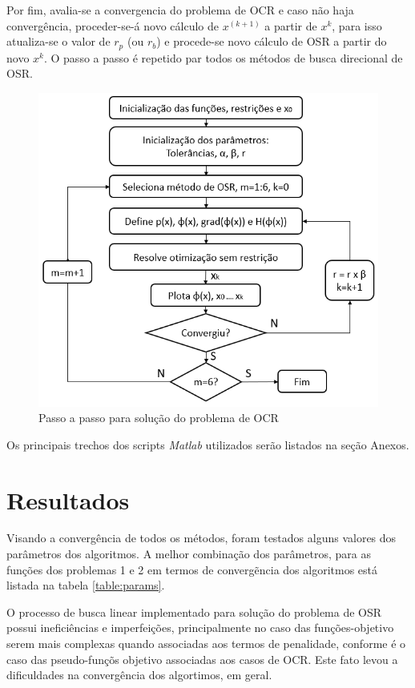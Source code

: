\documentclass[10pt, a4paper]{article}
\begin{document}
 Por fim, avalia-se a convergencia do problema de OCR e caso n\~ao haja converg\^encia, proceder-se-\'a novo c\'alculo de $x^(k+1)$ a partir de $x^k$, para isso atualiza-se o valor de $r_p$ (ou $r_b$) e procede-se novo c\'alculo de OSR a partir do novo $x^k$. O passo a passo \'e repetido par todos os m\'etodos de busca direcional de OSR.

\begin{figure}[H]
      \centering
      \includegraphics[width=.7\textwidth]{workflow.PNG}
      \caption{Passo a passo para solu\c c\~ao do problema de OCR}
      \label{fig:workflow}
\end{figure}

Os principais trechos dos scripts \textit{Matlab} utilizados ser\~ao listados na se\c c\~ao Anexos.

\section{Resultados}

Visando a converg\^encia de todos os m\'etodos, foram testados alguns valores dos par\^ametros dos algoritmos. A melhor combina\c c\~ao dos par\^ametros, para as fun\c c\~oes dos problemas 1 e 2 em termos de converg\~encia dos algoritmos est\'a listada na tabela \ref{table:params}.

O processo de busca linear implementado para solu\c c\~ao do problema de OSR possui inefici\^encias e imperfei\c c\~oes, principalmente no caso das fun\c c\~oes-objetivo serem mais complexas quando associadas aos termos de penalidade, conforme \'e o caso das pseudo-fun\c c\~os objetivo associadas aos casos de OCR. Este fato levou a dificuldades na converg\^encia dos algortimos, em geral.
\end{document}
